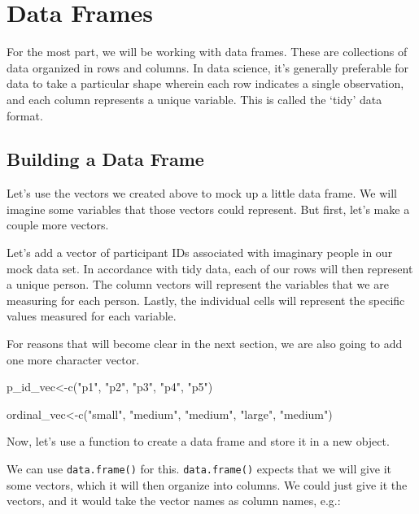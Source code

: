 \documentclass[
  letterpaper,
  DIV=11,
  numbers=noendperiod]{scrreprt}
\newenvironment{Shaded}{\begin{snugshade}}{\end{snugshade}}
\newcommand{\FunctionTok}[1]{\textcolor[rgb]{0.28,0.35,0.67}{#1}}
\newcommand{\NormalTok}[1]{\textcolor[rgb]{0.00,0.23,0.31}{#1}}
\newcommand{\OtherTok}[1]{\textcolor[rgb]{0.00,0.23,0.31}{#1}}
\newcommand{\StringTok}[1]{\textcolor[rgb]{0.13,0.47,0.30}{#1}}
\begin{document}
\section{Data Frames}\label{data-frames}

For the most part, we will be working with data frames. These are
collections of data organized in rows and columns. In data science, it's
generally preferable for data to take a particular shape wherein each
row indicates a single observation, and each column represents a unique
variable. This is called the `tidy' data format.

\subsection{Building a Data Frame}\label{building-a-data-frame}

Let's use the vectors we created above to mock up a little data frame.
We will imagine some variables that those vectors could represent. But
first, let's make a couple more vectors.

Let's add a vector of participant IDs associated with imaginary people
in our mock data set. In accordance with tidy data, each of our rows
will then represent a unique person. The column vectors will represent
the variables that we are measuring for each person. Lastly, the
individual cells will represent the specific values measured for each
variable.

For reasons that will become clear in the next section, we are also
going to add one more character vector.

\begin{Shaded}
\begin{Highlighting}[]
\NormalTok{p\_id\_vec}\OtherTok{\textless{}{-}}\FunctionTok{c}\NormalTok{(}\StringTok{"p1"}\NormalTok{, }\StringTok{"p2"}\NormalTok{, }\StringTok{"p3"}\NormalTok{, }\StringTok{"p4"}\NormalTok{, }\StringTok{"p5"}\NormalTok{)}

\NormalTok{ordinal\_vec}\OtherTok{\textless{}{-}}\FunctionTok{c}\NormalTok{(}\StringTok{"small"}\NormalTok{, }\StringTok{"medium"}\NormalTok{, }\StringTok{"medium"}\NormalTok{, }\StringTok{"large"}\NormalTok{, }\StringTok{"medium"}\NormalTok{)}
\end{Highlighting}
\end{Shaded}

Now, let's use a function to create a data frame and store it in a new
object.

We can use \texttt{data.frame()} for this. \texttt{data.frame()} expects
that we will give it some vectors, which it will then organize into
columns. We could just give it the vectors, and it would take the vector
names as column names, e.g.:
\end{document}
